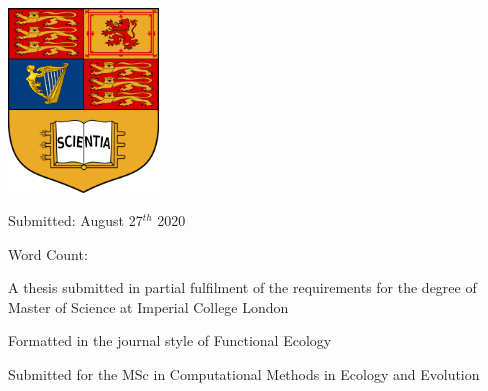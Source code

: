 \begin{titlepage}
	\vspace*{2\baselineskip} %
	
	
	
%	
%	
%	
%	
%	
%	
	

	
	
	\includegraphics[width = 4cm, keepaspectratio]{../images/IC_crest.pdf}
	
	\vspace{0.3\baselineskip} %
	
	Submitted: August 27$^{th}$ 2020 %
	
	
	
	\begin{center}
		Word Count: \wordcount
	\end{center}
	\vspace{0.5\baselineskip}
	
	A thesis submitted in partial fulfilment of the requirements for the degree of
	Master of Science at Imperial College London
	\vspace{0.5\baselineskip}
	
	Formatted in the journal style of Functional Ecology	
	\vspace{0.5\baselineskip}
	
	Submitted for the MSc in Computational Methods in Ecology and Evolution
	
\end{titlepage}
